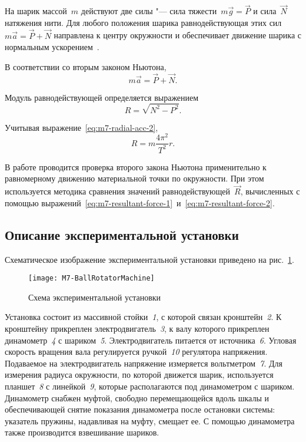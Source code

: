 \documentclass[a4paper, 12pt]{extarticle}
\begin{document}
На шарик массой~$m$ действуют две силы "--- сила тяжести~$m\vec{g} = \vec{P}$ и сила~$\vec{N}$ натяжения нити. Для любого положения шарика равнодействующая этих сил~$m\vec{a} = \vec{P} + \vec{N}$ направлена к центру окружности и обеспечивает движение шарика с нормальным ускорением~.

В соответствии со вторым законом Ньютона, %
\begin{equation}
\label{eq:m7-2nd-newton's-law}
m\vec{a} = \vec{P} + \vec{N}.
\end{equation}

Модуль равнодействующей определяется выражением
\begin{equation}
\label{eq:m7-resultant-force-1}
R = \sqrt{N^2 - P^2}.
\end{equation}

Учитывая выражение~\eqref{eq:m7-radial-acc-2},
\begin{equation}
\label{eq:m7-resultant-force-2}
R = m\frac{4\pi^2}{T^2}r.
\end{equation}

В работе проводится проверка второго закона Ньютона применительно к равномерному движению материальной точки по окружности. При этом используется методика сравнения значений равнодействующей~$\vec{R}$, вычисленных с помощью выражений~\eqref{eq:m7-resultant-force-1}~и~\eqref{eq:m7-resultant-force-2}.

\subsection{Описание экспериментальной установки}
Схематическое изображение  экспериментальной установки приведено на рис.~\ref{fig:m7-equipment}.

\begin{figure}[h] %
\begin{center}
\texttt{[image: M7-BallRotatorMachine]}
\end{center}
\caption{Схема экспериментальной установки \label{fig:m7-equipment}}
\end{figure}

Установка состоит из массивной стойки~\emph{1}, с которой связан кронштейн~\emph{2}. К кронштейну прикреплен электродвигатель~\emph{3}, к валу которого прикреплен динамометр~\emph{4} с шариком~\emph{5}. Электродвигатель питается от источника~\emph{6}. Угловая скорость вращения вала регулируется ручкой~\emph{10} регулятора напряжения. Подаваемое на электродвигатель напряжение измеряется вольтметром~\emph{7}. Для измерения радиуса окружности, по которой движется шарик, используется планшет~\emph{8} с линейкой~\emph{9}, которые располагаются под динамометром с шариком. Динамометр снабжен муфтой, свободно перемещающейся  вдоль шкалы и обеспечивающей снятие показания динамометра после остановки системы: указатель пружины, надавливая на муфту, смещает ее. С помощью динамометра также производится взвешивание шариков.
\end{document}
